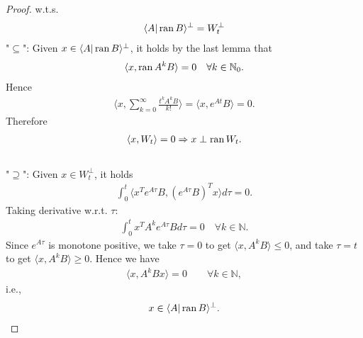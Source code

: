 \begin{proof}
w.t.s. 
\begin{align*}
	\langle A| \operatorname{ran} B\rangle^\perp = W_t^\perp
\end{align*}
"$\subseteq$": Given $x \in \langle A|\operatorname{ran} B \rangle^\perp$, it holds by the last lemma that
\begin{align*}
	\langle x, \operatorname{ran} A^kB \rangle = 0 \quad \forall k \in \mathbb{N}_0. 
\end{align*}
Hence
\begin{align*}
	\langle x, \sum_{k = 0}^\infty \frac{t^k A^k B}{k!}  \rangle = \langle x, e^{At} B  \rangle = 0.
\end{align*}
Therefore
\begin{align*}
	\langle x, W_t\rangle = 0 \Rightarrow x \perp \operatorname{ran} W_t. 
\end{align*}
\quad\\
"$\supseteq$": Given $x \in W_t^\perp$, it holds
\begin{align*}
	\int_0^t \langle x^T e^{A\tau} B, (e^{A\tau}B)^T x \rangle  d\tau = 0. 
\end{align*}
Taking derivative w.r.t. $\tau$:
\begin{align*}
	\int_0^t x^T A^k e^{A\tau} B d\tau = 0 \quad \forall k \in \mathbb{N}. 
\end{align*}
Since $e^{A\tau}$ is monotone positive, we take $\tau = 0$ to get $\langle x, A^kB\rangle \le 0$, and take $\tau = t$ to get $\langle x, A^k B \rangle \ge 0$. Hence we have 
\begin{align*}
	\langle x, A^k B x \rangle = 0 \qquad \forall k \in \mathbb{N},  
\end{align*}
i.e., 
\begin{align*}
	x \in \langle A| \operatorname{ran} B\rangle^\perp. 
\end{align*}
\end{proof}

